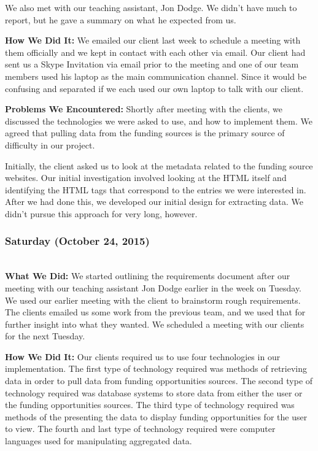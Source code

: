 \documentclass[onecolumn]{IEEEtran}
\begin{document}
    We also met with our teaching assistant, Jon Dodge. We didn't have much to report, but he gave a summary on what he expected from us.  
    
    \textbf{How We Did It: } 
    We emailed our client last week to schedule a meeting with them officially and we kept in contact with each other via email. Our client had sent us a Skype Invitation via email prior to the meeting and one of our team members used his laptop as the main communication channel. Since it would be confusing and separated if we each used our own laptop to talk with our client.  
    
    \textbf{Problems We Encountered: } 
    Shortly after meeting with the clients, we discussed the technologies we were asked to use, and how to implement them. We agreed that pulling data from the funding sources is the primary source of difficulty in our project.  

    Initially, the client asked us to look at the metadata related to the funding source websites. Our initial investigation involved looking at the HTML itself and identifying the HTML tags that correspond to the entries we were interested in. After we had done this, we developed our initial design for extracting data. We didn't pursue this approach for very long, however.  

\subsubsection{Saturday (October 24, 2015)} \hspace*{\fill} \\  
    \textbf{What We Did: }
    We started outlining the requirements document after our meeting with our teaching assistant Jon Dodge earlier in the week on Tuesday. We used our earlier meeting with the client to brainstorm rough requirements. The clients emailed us some work from the previous team, and we used that for further insight into what they wanted. We scheduled a meeting with our clients for the next Tuesday.  
    
    \textbf{How We Did It: } 
    Our clients required us to use four technologies in our implementation. The first type of technology required was methods of retrieving data in order to pull data from funding opportunities sources. The second type of technology required was database systems to store data from either the user or the funding opportunities sources. The third type of technology required was methods of the presenting the data to display funding opportunities for the user to view. The fourth and last type of technology required were computer languages used for manipulating aggregated data.  
    
\end{document}
